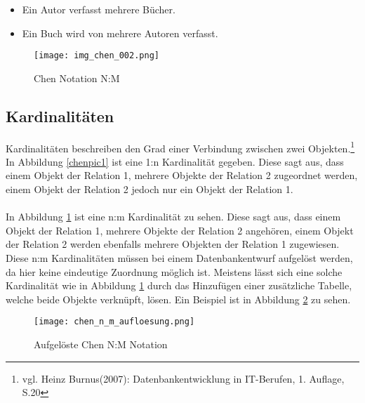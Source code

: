 \begin{itemize}
\item Ein Autor verfasst mehrere Bücher.
\item Ein Buch wird von mehrere Autoren verfasst.
\end{itemize}

\begin{figure}[H]
\begin{center}
\texttt{[image: img\_chen\_002.png]}
\caption{Chen Notation N:M}
\label{chenpic2}
\end{center}
\end{figure}

\subsection{Kardinalitäten}

Kardinalitäten beschreiben den Grad einer Verbindung zwischen zwei Objekten.\footnote{vgl. Heinz Burnus(2007): Datenbankentwicklung in IT-Berufen, 1. Auflage, S.20}
In Abbildung \ref{chenpic1} ist eine 1:n Kardinalität gegeben.
Diese sagt aus, dass einem Objekt der Relation 1, mehrere Objekte der Relation 2 zugeordnet werden, einem Objekt der Relation 2 jedoch nur ein Objekt der Relation 1.\\\\
In Abbildung \ref{chenpic2} ist eine n:m Kardinalität zu sehen.
Diese sagt aus, dass einem Objekt der Relation 1, mehrere Objekte der Relation 2 angehören, einem Objekt der Relation 2 werden ebenfalls mehrere Objekten der Relation 1 zugewiesen.
Diese n:m Kardinalitäten müssen bei einem Datenbankentwurf aufgelöst werden, da hier keine eindeutige Zuordnung möglich ist. Meistens lässt sich eine solche Kardinalität wie in Abbildung \ref{chenpic2} durch das Hinzufügen einer zusätzliche Tabelle, welche beide Objekte verknüpft, lösen.
Ein Beispiel ist in Abbildung \ref{chenpic3} zu sehen.

\begin{figure}[H]
\begin{center}
\texttt{[image: chen\_n\_m\_aufloesung.png]}
\caption{Aufgelöste Chen N:M Notation}
\label{chenpic3}
\end{center}
\end{figure}

